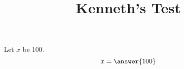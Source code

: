 \documentclass{ximera}
\title{Kenneth's Test}
\begin{document}
\maketitle
\begin{exercise}
Let $x$ be 100.
\[ x = \answer{100}\]
\end{exercise}
\end{document}
